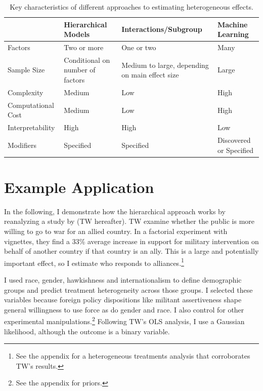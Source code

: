 \documentclass[12pt]{article}
\begin{document}
\begin{table}
\begin{tabular}{|p{1in}|p{1.5in}|p{1.5in}|p{1.5in}|} \hline
                 & Hierarchical Models & Interactions/Subgroup & Machine Learning \\
\hline
Factors              & Two or more          & One or two         & Many \\ \hline
Sample Size          & Conditional on number of factors            & Medium to large, depending on main effect size    & Large \\ \hline
Complexity           & Medium             & Low                & High \\ \hline
Computational Cost   & Medium             & Low                & High \\ \hline
Interpretability     & High               & High               & Low \\ \hline
Modifiers            & Specified          & Specified      & Discovered or Specified \\
\hline
\end{tabular}
\caption{Key characteristics of different approaches to estimating heterogeneous effects.}
\label{tab:tools-det}
\end{table}


\section{Example Application} 


In the following, I demonstrate how the hierarchical approach works by reanalyzing a study by \citet{TomzWeeks2021} (TW hereafter). 
TW examine whether the public is more willing to go to war for an allied country.
In a factorial experiment with vignettes, they find a 33\% average increase in support for military intervention on behalf of another country if that country is an ally. 
This is a large and potentially important effect, so I estimate who responds to alliances.\footnote{See the appendix for a heterogeneous treatments analysis that corroborates TW's results.}


I used race, gender, hawkishness and internationalism to define demographic groups and predict treatment heterogeneity across those groups. 
I selected these variables because foreign policy dispositions like militant assertiveness shape general willingness to use force \citep{Kertzeretal2014} as do gender \citep{Barnhartetal2020} and race. 
I also control for other experimental manipulations.\footnote{See the appendix for priors.} 
Following TW's OLS analysis, I use a Gaussian likelihood, although the outcome is a binary variable. 
\end{document}

